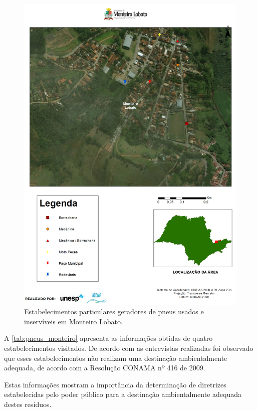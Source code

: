 \begin{description}
		\begin{figure}
			\centering
			\includegraphics[width=1\linewidth]{produtos/prodtres/image092}
			\caption{Estabelecimentos particulares geradores de pneus usados e inservíveis em Monteiro Lobato.}
			\label{fig:image092}
		\end{figure}
		
	
		A \autoref{tab:pneus_monteiro} apresenta as informações obtidas de quatro estabelecimentos visitados. De acordo com as entrevistas realizadas foi observado que esses estabelecimentos não realizam uma destinação ambientalmente adequada, de acordo com a Resolução CONAMA nº 416 de 2009.
	 
		
	
		Estas informações mostram a importância da determinação de diretrizes estabelecidas pelo poder público para a destinação ambientalmente adequada destes resíduos.
	

\end{description}
